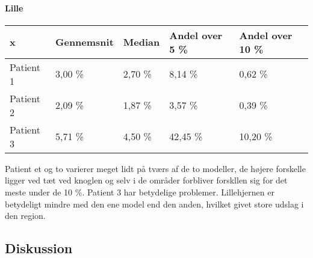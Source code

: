 \paragraph{Lille}

\begin{center}
    \begin{tabular}{| l | l | l | l | l |}
    \hline
    x & Gennemsnit & Median & Andel over 5 \% & Andel over 10 \% \\ \hline
    Patient 1 & 3,00 \% & 2,70 \% & 8,14 \% & 0,62 \% \\ \hline
    Patient 2 & 2,09 \% & 1,87 \% & 3,57 \% & 0,39 \% \\ \hline
    Patient 3 & 5,71 \% & 4,50 \% & 42,45 \% & 10,20 \% \\ \hline
    \end{tabular}
\end{center}

Patient et og to varierer meget lidt på tværs af de to modeller, de højere
forskelle ligger ved tæt ved knoglen og selv i de områder forbliver
forskllen sig for det meste under de 10 \%. Patient 3 har betydelige
problemer. Lillehjernen er betydeligt mindre med den ene model end den
anden, hvilket givet store udslag i den region. 


\subsection{Diskussion}



